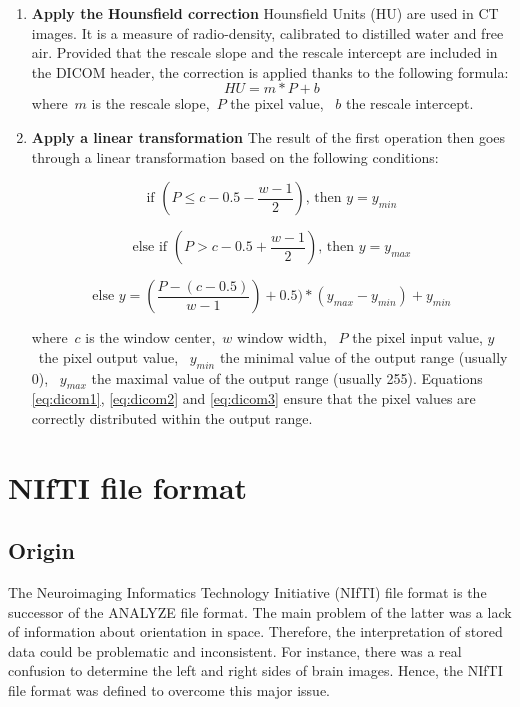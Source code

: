 \begin{enumerate}
	\item \textbf{Apply the Hounsfield correction}\newline
	Hounsfield Units (HU) are used in CT images. It is a measure of radio-density, calibrated to distilled water and free air. Provided that the rescale slope and the rescale intercept are included in the DICOM header, the correction is applied thanks to the following formula:
\begin{equation}
	HU = m * P + b
\end{equation}
	where~$m$ is the rescale slope,~$P$ the pixel value, ~$b$ the rescale intercept.

	\item \textbf{Apply a linear transformation}\newline
	The result of the first operation then goes through a linear transformation based on the following conditions: 

\begin{equation}\label{eq:dicom1}
\textrm{if } (P \leq c - 0.5 - \frac{w-1}{2}) \textrm{, then }y = y_{min}
\end{equation}

\begin{equation}\label{eq:dicom2}
\textrm{else if } (P > c - 0.5 + \frac{w-1}{2}) \textrm{, then }y = y_{max}
\end{equation}

\begin{equation}\label{eq:dicom3}
\textrm{else } y = (\frac{P - (c - 0.5)}{w-1}) + 0.5) * (y_{max} - y_{min}) + y_{min}
\end{equation}

where~$c$ is the window center,~$w$ window width, ~$P$ the pixel input value, \mbox{$y$ the} pixel output value, ~$y_{min}$ the minimal value of the output range (usually 0), ~$y_{max}$ the maximal value of the output range (usually 255). Equations \ref{eq:dicom1}, \ref{eq:dicom2} and \ref{eq:dicom3} ensure that the pixel values are correctly distributed within the output range. 
\end{enumerate}


\section{NIfTI file format}
\subsection{Origin}
\setlength{\marginparwidth}{3cm}\leavevmode {}The Neuroimaging Informatics Technology Initiative (NIfTI) file format is the successor of the ANALYZE file format. The main problem of the latter was a lack of information about orientation in space. Therefore, the interpretation of stored data could be problematic and inconsistent. For instance, there was a real confusion to determine the left and right sides of brain images. Hence, the NIfTI file format was defined to overcome this major issue.


